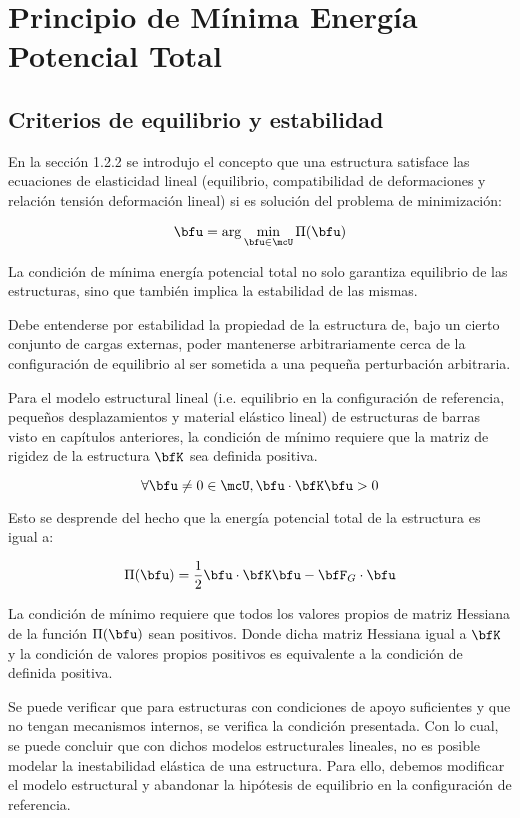 \section{Principio de Mínima Energía Potencial Total}

\subsection{Criterios de equilibrio y estabilidad} 
En la sección 1.2.2 se introdujo el concepto que una estructura satisface las ecuaciones de elasticidad lineal (equilibrio, compatibilidad de deformaciones y relación tensión deformación lineal) si es solución del problema de minimización:

\begin{equation*}
\bfu = \arg\min_{\bfu\in\mcU} \Pi(\bfu)
\end{equation*}

La condición de mínima energía potencial total no solo garantiza equilibrio de las estructuras, sino que también implica la estabilidad de las mismas.

Debe entenderse por estabilidad la propiedad de la estructura de, bajo un cierto conjunto de cargas externas, poder mantenerse arbitrariamente cerca de la configuración de equilibrio al ser sometida a una pequeña perturbación arbitraria.

Para el modelo estructural lineal (i.e. equilibrio en la configuración de referencia, pequeños desplazamientos y material elástico lineal) de estructuras de barras visto en capítulos anteriores, la condición de mínimo requiere que la matriz de rigidez de la estructura $\bfK$ sea definida positiva.

$$\forall \bfu\neq 0 \in \mcU, \bfu \cdot \bfK \bfu > 0$$

Esto se desprende del hecho que la energía potencial total de la estructura es igual a:

$$\Pi(\bfu)= \frac{1}{2} \bfu \cdot \bfK \bfu - \bfF_G \cdot \bfu$$

La condición de mínimo requiere que todos los valores propios de matriz Hessiana de la función $\Pi(\bfu)$ sean positivos. Donde dicha matriz Hessiana igual a $\bfK$ y la condición de valores propios positivos es equivalente a la condición de definida positiva. 

Se puede verificar que para estructuras con condiciones de apoyo suficientes y que no tengan mecanismos internos, se verifica la condición presentada. Con lo cual, se puede concluir que con dichos modelos estructurales lineales, no es posible modelar la inestabilidad elástica de una estructura. Para ello, debemos modificar el modelo estructural y abandonar la hipótesis de equilibrio en la configuración de referencia.
 
